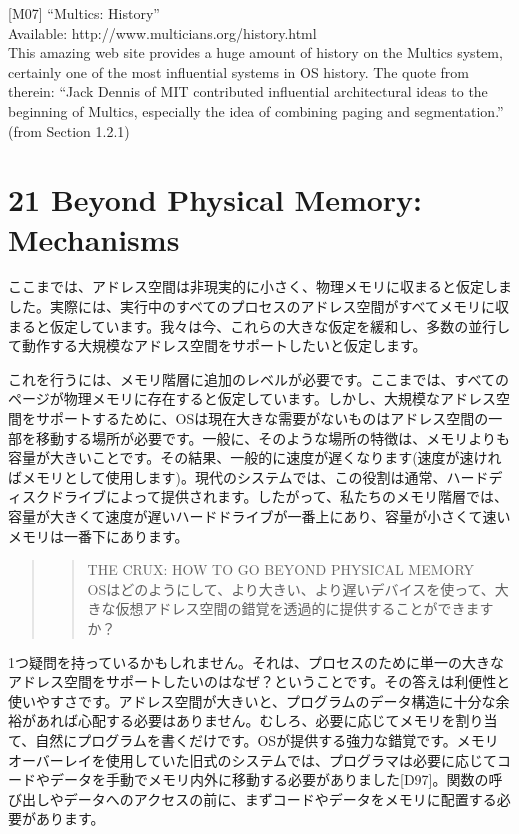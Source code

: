 {[}M07{]} ``Multics: History''\\
Available: http://www.multicians.org/history.html\\
This amazing web site provides a huge amount of history on the Multics
system, certainly one of the most influential systems in OS history. The
quote from therein: ``Jack Dennis of MIT contributed influential
architectural ideas to the beginning of Multics, especially the idea of
combining paging and segmentation.'' (from Section 1.2.1)

\hypertarget{beyond-physical-memory-mechanisms}{%
\section*{21 Beyond Physical Memory:
Mechanisms}\label{beyond-physical-memory-mechanisms}}

ここまでは、アドレス空間は非現実的に小さく、物理メモリに収まると仮定しました。実際には、実行中のすべてのプロセスのアドレス空間がすべてメモリに収まると仮定しています。我々は今、これらの大きな仮定を緩和し、多数の並行して動作する大規模なアドレス空間をサポートしたいと仮定します。

これを行うには、メモリ階層に追加のレベルが必要です。ここまでは、すべてのページが物理メモリに存在すると仮定しています。しかし、大規模なアドレス空間をサポートするために、OSは現在大きな需要がないものはアドレス空間の一部を移動する場所が必要です。一般に、そのような場所の特徴は、メモリよりも容量が大きいことです。その結果、一般的に速度が遅くなります(速度が速ければメモリとして使用します)。現代のシステムでは、この役割は通常、ハードディスクドライブによって提供されます。したがって、私たちのメモリ階層では、容量が大きくて速度が遅いハードドライブが一番上にあり、容量が小さくて速いメモリは一番下にあります。

\begin{quote}
\begin{quote}
THE CRUX: HOW TO GO BEYOND PHYSICAL MEMORY\\
OSはどのようにして、より大きい、より遅いデバイスを使って、大きな仮想アドレス空間の錯覚を透過的に提供することができますか？
\end{quote}
\end{quote}

1つ疑問を持っているかもしれません。それは、プロセスのために単一の大きなアドレス空間をサポートしたいのはなぜ？ということです。その答えは利便性と使いやすさです。アドレス空間が大きいと、プログラムのデータ構造に十分な余裕があれば心配する必要はありません。むしろ、必要に応じてメモリを割り当て、自然にプログラムを書くだけです。OSが提供する強力な錯覚です。メモリオーバーレイを使用していた旧式のシステムでは、プログラマは必要に応じてコードやデータを手動でメモリ内外に移動する必要がありました{[}D97{]}。関数の呼び出しやデータへのアクセスの前に、まずコードやデータをメモリに配置する必要があります。

